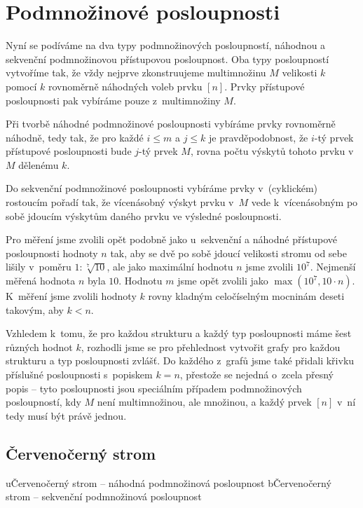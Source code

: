 \section{Podmnožinové posloupnosti}

Nyní se podíváme na dva typy podmnožinových posloupností, náhodnou a sekvenční
podmnožinovou přístupovou posloupnost. Oba typy posloupností vytvoříme tak, že
vždy nejprve zkonstruujeme multimnožinu $M$ velikosti $k$ pomocí $k$
rovnoměrně náhodných voleb prvku $[n]$. Prvky
přístupové posloupnosti pak vybíráme pouze z~multimnožiny $M$. 

Při tvorbě
náhodné podmnožinové posloupnosti vybíráme prvky rovnoměrně náhodně, tedy tak, že pro každé
$i\leq m$ a $j\leq k$ je pravděpodobnost, že $i$-tý prvek přístupové
posloupnosti bude $j$-tý prvek $M$, rovna počtu výskytů tohoto prvku v~$M$
dělenému $k$.

Do sekvenční podmnožinové posloupnosti vybíráme prvky v~(cyklickém) rostoucím pořadí tak, že vícenásobný výskyt prvku v~$M$ vede k~vícenásobným po sobě jdoucím výskytům daného prvku ve výsledné posloupnosti. 

Pro měření jsme zvolili opět podobně jako u~sekvenční a náhodné přístupové
posloupnosti hodnoty $n$ tak, aby se dvě po sobě jdoucí velikosti stromu od
sebe lišily v~poměru $1:\sqrt[7]{10}$, ale jako maximální hodnotu $n$ jsme
zvolili $10^7$. Nejmenší měřená hodnota $n$ byla $10$. Hodnotu $m$ jsme
opět zvolili jako $\max(10^7, 10\cdot n)$. K~měření jsme zvolili hodnoty
$k$ rovny kladným celočíselným mocninám deseti takovým, aby $k<n$.

Vzhledem k~tomu, že pro každou strukturu a každý typ posloupnosti máme šest
různých hodnot $k$, rozhodli jsme se pro přehlednost vytvořit grafy pro každou
strukturu a typ posloupnosti zvlášť. Do každého z~grafů jsme také přidali
křivku příslušné  posloupnosti s~popiskem $k=n$, přestože se
nejedná o~zcela přesný popis -- tyto posloupnosti jsou speciálním případem
podmnožinových posloupností, kdy $M$ není multimnožinou, ale množinou, a každý
prvek $[n]$ v~ní tedy musí být právě jednou.

\subsection{Červenočerný strom}

u{Červenočerný strom -- náhodná podmnožinová posloupnost}
b{Červenočerný strom -- sekvenční podmnožinová posloupnost}

